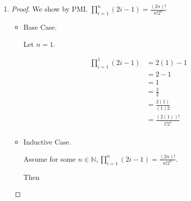\documentclass[12pt,letterpaper]{article}
\begin{document}
\begin{enumerate}
\begin{enumerate}
\begin{enumerate}
\begin{proof}
\begin{itemize}
                  \item
                    From the Base case and the inductive case,
                    we use the PMI to state $\sum\limits_{i = 1}^n \frac{1}{\left(2i - 1\right)\left(2i + 1\right)} = \frac{n}{2n + 1}, \forall n \in \mathbb{N}$
                \end{itemize}
              \end{proof}
            \setcounter{enumiii}{10}
            \item
              \begin{proof}
                We show by PMI.
                $\prod\limits_{i = 1}^{n}(2i - 1) = \frac{\left(2n\right)!}{n! 2^n}$
                \begin{itemize}
                  \item Base Case.

                    Let $n = 1$.

                    \begin{align*}
                      \prod\limits_{i = 1}^1(2i - 1)
                      &= 2(1) - 1 \\
                      &= 2 - 1 \\
                      &= 1 \\
                      &= \frac{2}{2} \\
                      &= \frac{2(1)}{(1)2} \\
                      &= \frac{\left(2\left(1\right)\right)!}{1! 2^1} \\
                    \end{align*}
                  \item Inductive Case.

                    Assume for some $n \in \mathbb{N}, \prod\limits_{i = 1}^{n}(2i - 1) = \frac{\left(2n\right)!}{n! 2^n}$.

                    Then


\end{itemize}
\end{proof}
\end{enumerate}
\end{enumerate}
\end{enumerate}
\end{document}
